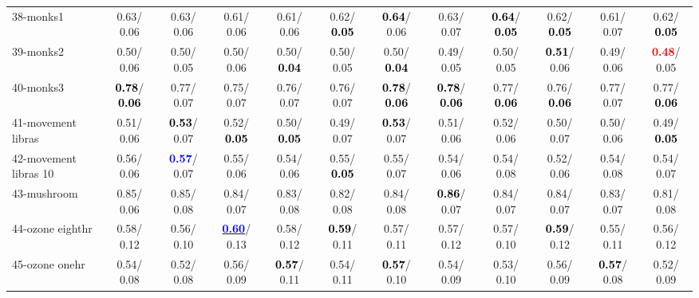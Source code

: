 \begin{table}[h]
\begin{center}
{\begin{tabular}{lc|c|c|c|c|c|c|c|c|c|c}
38-monks1 &   0.63/  0.06 &   0.63/  0.06 &   0.61/  0.06 &   0.61/  0.06 &   0.62/\textcolor{black}{\textbf{  0.05}} & \textcolor{black}{\textbf{  0.64}}/  0.06 &   0.63/  0.07 & \textcolor{black}{\textbf{  0.64}}/\textcolor{black}{\textbf{  0.05}} &   0.62/\textcolor{black}{\textbf{  0.05}} &   0.61/  0.07 &   0.62/\textcolor{black}{\textbf{  0.05}} \\
39-monks2 &   0.50/  0.06 &   0.50/  0.05 &   0.50/  0.06 &   0.50/\textcolor{black}{\textbf{  0.04}} &   0.50/  0.05 &   0.50/\textcolor{black}{\textbf{  0.04}} &   0.49/  0.05 &   0.50/  0.05 & \textcolor{black}{\textbf{  0.51}}/  0.06 &   0.49/  0.06 & \textcolor{red}{\textbf{  0.48}}/  0.05 \\ \hline
40-monks3 & \textcolor{black}{\textbf{  0.78}}/\textcolor{black}{\textbf{  0.06}} &   0.77/  0.07 &   0.75/  0.07 &   0.76/  0.07 &   0.76/  0.07 & \textcolor{black}{\textbf{  0.78}}/\textcolor{black}{\textbf{  0.06}} & \textcolor{black}{\textbf{  0.78}}/\textcolor{black}{\textbf{  0.06}} &   0.77/\textcolor{black}{\textbf{  0.06}} &   0.76/\textcolor{black}{\textbf{  0.06}} &   0.77/  0.07 &   0.77/\textcolor{black}{\textbf{  0.06}} \\
41-movement libras &   0.51/  0.06 & \textcolor{black}{\textbf{  0.53}}/  0.07 &   0.52/\textcolor{black}{\textbf{  0.05}} &   0.50/\textcolor{black}{\textbf{  0.05}} &   0.49/  0.07 & \textcolor{black}{\textbf{  0.53}}/  0.07 &   0.51/  0.06 &   0.52/  0.06 &   0.50/  0.07 &   0.50/  0.06 &   0.49/\textcolor{black}{\textbf{  0.05}} \\
42-movement libras 10 &   0.56/  0.06 & \textcolor{blue}{\textbf{  0.57}}/  0.07 &   0.55/  0.06 &   0.54/  0.06 &   0.55/\textcolor{black}{\textbf{  0.05}} &   0.55/  0.07 &   0.54/  0.06 &   0.54/  0.08 &   0.52/  0.06 &   0.54/  0.08 &   0.54/  0.07 \\
43-mushroom &   0.85/  0.06 &   0.85/  0.08 &   0.84/  0.07 &   0.83/  0.08 &   0.82/  0.08 &   0.84/  0.08 & \textcolor{black}{\textbf{  0.86}}/  0.07 &   0.84/  0.07 &   0.84/  0.07 &   0.83/  0.07 &   0.81/  0.08 \\
44-ozone eighthr &   0.58/  0.12 &   0.56/  0.10 & \underline{\textcolor{blue}{\textbf{  0.60}}}/  0.13 &   0.58/  0.12 & \textcolor{black}{\textbf{  0.59}}/  0.11 &   0.57/  0.11 &   0.57/  0.12 &   0.57/  0.10 & \textcolor{black}{\textbf{  0.59}}/  0.12 &   0.55/  0.11 &   0.56/  0.12 \\
45-ozone onehr &   0.54/  0.08 &   0.52/  0.08 &   0.56/  0.09 & \textcolor{black}{\textbf{  0.57}}/  0.11 &   0.54/  0.11 & \textcolor{black}{\textbf{  0.57}}/  0.10 &   0.54/  0.09 &   0.53/  0.10 &   0.56/  0.09 & \textcolor{black}{\textbf{  0.57}}/  0.08 &   0.52/  0.09 \\

\end{tabular}}
\end{center}
\end{table}
